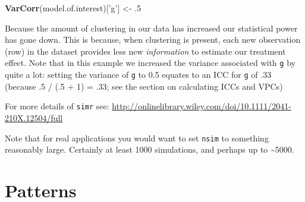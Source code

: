 \documentclass[]{article}
\newenvironment{Shaded}{\begin{snugshade}}{\end{snugshade}}
\newcommand{\ControlFlowTok}[1]{\textcolor[rgb]{0.13,0.29,0.53}{\textbf{#1}}}
\newcommand{\DecValTok}[1]{\textcolor[rgb]{0.00,0.00,0.81}{#1}}
\newcommand{\FloatTok}[1]{\textcolor[rgb]{0.00,0.00,0.81}{#1}}
\newcommand{\KeywordTok}[1]{\textcolor[rgb]{0.13,0.29,0.53}{\textbf{#1}}}
\newcommand{\NormalTok}[1]{#1}
\newcommand{\OperatorTok}[1]{\textcolor[rgb]{0.81,0.36,0.00}{\textbf{#1}}}
\newcommand{\StringTok}[1]{\textcolor[rgb]{0.31,0.60,0.02}{#1}}
\begin{document}
\begin{Shaded}
\begin{Highlighting}[]
\KeywordTok{VarCorr}\NormalTok{(model.of.interest)[}\StringTok{'g'}\NormalTok{] <-}\StringTok{ }\FloatTok{.5}
\end{Highlighting}
\end{Shaded}

\begin{Shaded}
\end{Shaded}

Because the amount of clustering in our data has increased our statistical power
has gone down. This is because, when clustering is present, each new observation
(row) in the dataset provides less new \emph{information} to estimate our treatment
effect. Note that in this example we increased the variance associated with \texttt{g}
by quite a lot: setting the variance of \texttt{g} to 0.5 equates to an ICC for \texttt{g} of
.33 (because .5 / (.5 + 1) = .33; see the section on \protect\hypertarget{icc-and-vpc}{}{calculating ICCs and
VPCs})

For more details of \texttt{simr} see:
\url{http://onlinelibrary.wiley.com/doi/10.1111/2041-210X.12504/full}

{Note that for real applications you would want to set \texttt{nsim} to something
reasonably large. Certainly at least 1000 simulations, and perhaps up to
\textasciitilde{}5000.}

\hypertarget{part-patterns}{%
\part{Patterns}\label{part-patterns}}
\end{document}
